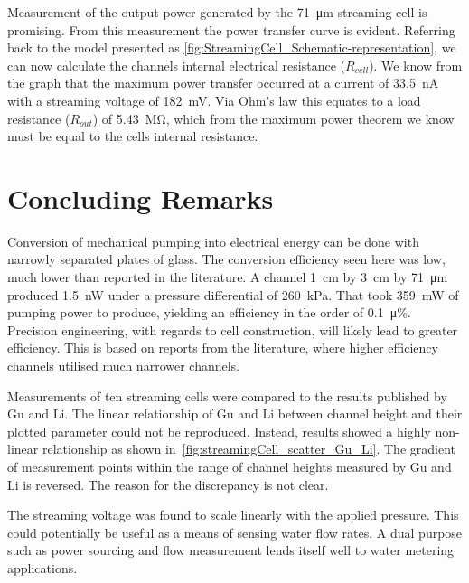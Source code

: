   Measurement of the output power generated by the \SI{71}{\micro\meter} streaming cell is promising.
  From this measurement the power transfer curve is evident.
  Referring back to the model presented as \cref{fig:StreamingCell_Schematic-representation}, we can now calculate the channels internal electrical resistance ($R_{cell}$).
  We know from the graph that the maximum power transfer occurred at a current of \SI{33.5}{\nano\ampere} with a streaming voltage of \SI{182}{\milli\volt}.
  Via Ohm's law this equates to a load resistance ($R_{out}$) of \SI{5.43}{\mega\ohm}, which from the maximum power theorem we know must be equal to the cells internal resistance.


\section{Concluding Remarks}
  \label{sect:part1_energyHarvesting_conclusion}

  Conversion of mechanical pumping into electrical energy can be done with narrowly separated plates of glass.
  The conversion efficiency seen here was low, much lower than reported in the literature.
  A channel \SI{1}{\centi\meter} by \SI{3}{\centi\meter} by \SI{71}{\micro\meter} produced \SI{1.5}{\nano\watt} under a pressure differential of \SI{260}{\kilo\pascal}.
  That took \SI{359}{\milli\watt} of pumping power to produce, yielding an efficiency in the order of \SI{0.1}{\micro\percent}.
  Precision engineering, with regards to cell construction, will likely lead to greater efficiency.
  This is based on reports from the literature, where higher efficiency channels utilised much narrower channels.

  Measurements of ten streaming cells were compared to the results published by Gu and Li.
  The linear relationship of Gu and Li between channel height and their plotted parameter could not be reproduced.
  Instead, results showed a highly non-linear relationship as shown in~\cref{fig:streamingCell_scatter_Gu_Li}.
  The gradient of measurement points within the range of channel heights measured by Gu and Li is reversed.
  The reason for the discrepancy is not clear.

  The streaming voltage was found to scale linearly with the applied pressure.
  This could potentially be useful as a means of sensing water flow rates.
  A dual purpose such as power sourcing and flow measurement lends itself well to water metering applications.


